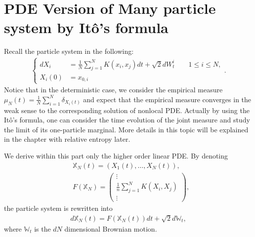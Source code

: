 \section{PDE Version of Many particle system by It\^o's formula}
Recall the particle system in the following:
\begin{align*}
  \begin{cases}  
  d X_i &=  \frac{1}{N} \sum_{j=1}^N K(x_i,x_j) dt + \sqrt{2} dW_t^i  \qquad 1\le i\le N ,\\
  X_i(0)    &= x_{0,i}   
  \end{cases}
.\end{align*}
Notice that in the deterministic case, we consider the empirical measure $\mu_N(t) = \frac{1}{N} \sum_{i=1}^{N} \delta_{X_i(t)} $ and expect that the empirical measure converges in the weak sense to the corresponding solution of nonlocal PDE. Actually by using the It\^o's formula, one can consider the time evolution of the joint measure and study the limit of its one-particle marginal. More details in this topic will be explained in the chapter with relative entropy later. 

We derive within this part only the higher order linear PDE.
By denoting  
\begin{align*}
&\mathbb{X}_N(t)= (X_{1}(t),\ldots ,X_N(t)),\\
&F(\mathbb{X}_N)=\begin{pmatrix} \vdots \\ \frac{1}{n} \sum_{j=1}^{N} K(X_i,X_j) \\ \vdots  \end{pmatrix},
\end{align*}
the particle system is rewritten into
\begin{align*}
  d\mathbb{X}_N(t) = F(\mathbb{X}_N(t)) dt + \sqrt{2}d\mathbb{W}_{t},
\end{align*}
where $\mathbb{W}_t$ is the $dN$ dimensional Brownian motion.

